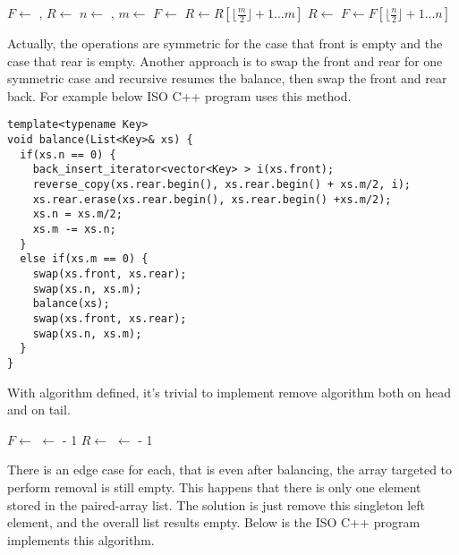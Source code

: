 \documentclass[UTF8]{article}
\begin{document}
\begin{algorithmic}
  \State $F \gets$ , $R \gets$ 
  \State $n \gets$ , $m \gets$ 
    \State $F \gets$ 
    \State $R \gets R[\lfloor \frac{m}{2} \rfloor + 1 ... m]$
    \State $R \gets$ 
    \State $F \gets F[\lfloor \frac{n}{2} \rfloor + 1 ... n]$
  \EndIf
\EndFunction
\end{algorithmic}

Actually, the operations are symmetric for the case that front is empty and the case that
rear is empty. Another approach is to swap the front and rear for one symmetric case
and recursive resumes the balance, then swap the front and rear back. For example
below ISO C++ program uses this method.

\begin{lstlisting}
template<typename Key>
void balance(List<Key>& xs) {
  if(xs.n == 0) {
    back_insert_iterator<vector<Key> > i(xs.front);
    reverse_copy(xs.rear.begin(), xs.rear.begin() + xs.m/2, i);
    xs.rear.erase(xs.rear.begin(), xs.rear.begin() +xs.m/2);
    xs.n = xs.m/2;
    xs.m -= xs.n;
  }
  else if(xs.m == 0) {
    swap(xs.front, xs.rear);
    swap(xs.n, xs.m);
    balance(xs);
    swap(xs.front, xs.rear);
    swap(xs.n, xs.m);
  }
}
\end{lstlisting}

With  algorithm defined, it's trivial to implement remove algorithm
both on head and on tail.

\begin{algorithmic}
  \State {}
  \State $F \gets $ 
    \State {}
  \Else
    \State {} $\gets $  - 1
  \EndIf
\EndFunction
\Statex
{}
  \State {}
  \State $R \gets $ 
    \State {}
  \Else
    \State {} $\gets $  - 1
  \EndIf
\EndFunction
\end{algorithmic}

There is an edge case for each, that is even after balancing, the array targeted to
perform removal is still empty. This happens that there is only one element stored
in the paired-array list. The solution is just remove this singleton left element,
and the overall list results empty. Below is the ISO C++ program implements this
algorithm.
\end{document}
